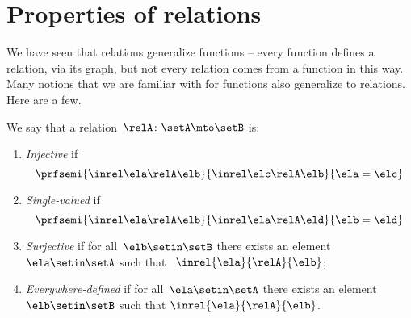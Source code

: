 
\section{Properties of relations}

We have seen that relations generalize functions -- every function defines a relation, via its graph, but not every relation comes from a function in this way.
Many notions that we are familiar with for functions also generalize to relations.
Here are a few.

\begin{ctdefinition}
    \label{def:rel_properties}
    We say that a relation~$\relA \colon \setA \mto \setB$ is:
    \begin{enumerate}
        \item \label{def:injective-relation} \emph{Injective} if
              \begin{equation}
                  \prfsemi{
                      \inrel \ela \relA \elb
                  }{
                      \inrel \elc \relA \elb
                  }{
                      \ela=\elc
                  }
              \end{equation}
        \item \label{def:single-valued-relation} \emph{Single-valued} if
              \begin{equation}
                  \prfsemi{
                      \inrel \ela \relA \elb
                  }{
                      \inrel \ela \relA \eld
                  }{
                      \elb = \eld
                  }
              \end{equation}
        \item \label{def:surjective-relation} \emph{Surjective} if for all~$\elb\setin \setB$ there exists an element~$\ela\setin \setA$ such that ~$\inrel{\ela}{\relA}{\elb}$;
        \item \label{def:everywhere-defined-relation} \emph{Everywhere-defined} if for all~$\ela\setin \setA$ there exists an element~$\elb \setin \setB$ such that $\inrel{\ela}{\relA}{\elb}$.
    \end{enumerate}
\end{ctdefinition}

